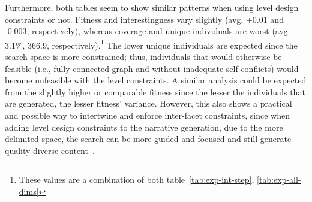 Furthermore, both tables seem to show similar patterns when using level design constraints or not. Fitness and interestingness vary slightly (avg. +0.01 and -0.003, respectively), whereas coverage and unique individuals are worst (avg. 3.1\%, 366.9, respectively).\footnote{These values are a combination of both table~\ref{tab:exp-int-step}, \ref{tab:exp-all-dims}} The lower unique individuals are expected since the search space is more constrained; thus, individuals that would otherwise be feasible (i.e., fully connected graph and without inadequate self-conflicts) would become unfeasible with the level constraints. A similar analysis could be expected from the slightly higher or comparable fitness since the lesser the individuals that are generated, the lesser fitness' variance. However, this also shows a practical and possible way to intertwine and enforce inter-facet constraints, since when adding level design constraints to the narrative generation, due to the more delimited space, the search can be more guided and focused and still generate quality-diverse content~\cite{p11gravina_constrained_2016,liapis_constrained_2015}. 


